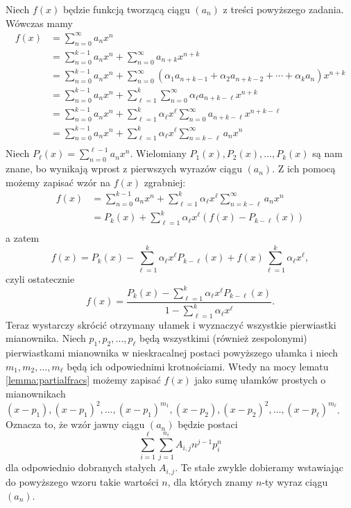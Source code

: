 \documentclass[shortabstract]{imthesis}
\begin{document}
    Niech $f(x)$ będzie funkcją tworzącą ciągu $(a_n)$ z treści powyższego zadania. Wówczas mamy
    \begin{align*}
        f(x) &= \sum_{n=0}^\infty a_nx^n \\
        &= \sum_{n=0}^{k-1} a_nx^n + \sum_{n=0}^\infty a_{n+k}x^{n+k} \\
        &= \sum_{n=0}^{k-1} a_nx^n + \sum_{n=0}^\infty \left(\alpha_1 a_{n+k-1} + \alpha_2 a_{n+k-2} + \cdots + \alpha_k a_{n}\right)x^{n+k} \\
        &= \sum_{n=0}^{k-1} a_nx^n + \sum_{\ell=1}^k \sum_{n=0}^\infty \alpha_\ell a_{n+k-\ell} x^{n+k} \\
        &= \sum_{n=0}^{k-1} a_nx^n + \sum_{\ell=1}^k \alpha_\ell x^\ell \sum_{n=0}^\infty a_{n+k-\ell} x^{n+k-\ell} \\
        &= \sum_{n=0}^{k-1} a_nx^n + \sum_{\ell=1}^k \alpha_\ell x^\ell \sum_{n=k-\ell}^\infty a_n x^n \\
    \end{align*}
    Niech $P_\ell(x) = \sum_{n=0}^{\ell-1} a_nx^n$. Wielomiany $P_1(x), P_2(x), \ldots, P_k(x)$ są nam znane, bo wynikają wprost z pierwszych wyrazów ciągu $(a_n)$. Z ich pomocą możemy zapisać wzór na $f(x)$ zgrabniej:
    \begin{align*}
        f(x) &= \sum_{n=0}^{k-1} a_nx^n + \sum_{\ell=1}^k \alpha_\ell x^\ell \sum_{n=k-\ell}^\infty a_n x^n \\
        &= P_k(x) + \sum_{\ell=1}^k \alpha_\ell x^\ell (f(x) - P_{k-\ell}(x)) \\
    \end{align*}
    a zatem
    $$
    f(x) = P_k(x) - \sum_{\ell=1}^k \alpha_\ell x^\ell P_{k-\ell}(x) + f(x) \sum_{\ell=1}^k \alpha_\ell x^\ell,
    $$
    czyli ostatecznie
    $$
    f(x) = \frac{P_k(x) - \sum_{\ell=1}^k \alpha_\ell x^\ell P_{k-\ell}(x)}{1-\sum_{\ell=1}^k \alpha_\ell x^\ell}.
    $$
    Teraz wystarczy skrócić otrzymany ułamek i wyznaczyć wszystkie pierwiastki mianownika. Niech $p_1, p_2, \ldots, p_\ell$ będą wszystkimi (również zespolonymi) pierwiastkami mianownika w nieskracalnej postaci powyższego ułamka i niech $m_1, m_2, \ldots, m_\ell$ będą ich odpowiednimi krotnościami. Wtedy na mocy lematu \ref{lemma:partialfracs} możemy zapisać $f(x)$ jako sumę ułamków prostych o mianownikach $(x-p_1), (x-p_1)^2, \ldots, (x-p_1)^{m_1}, (x-p_2), (x-p_2)^2, \ldots, (x-p_\ell)^{m_\ell}$. Oznacza to, że wzór jawny ciągu $(a_n)$ będzie postaci
    $$
    \sum_{i=1}^\ell \sum_{j=1}^{n_i} A_{i,j} n^{j-1} p_i^n
    $$
    dla odpowiednio dobranych stałych $A_{i, j}$. Te stałe zwykle dobieramy wstawiając do powyższego wzoru takie wartości $n$, dla których znamy $n$-ty wyraz ciągu $(a_n)$.
\end{document}
